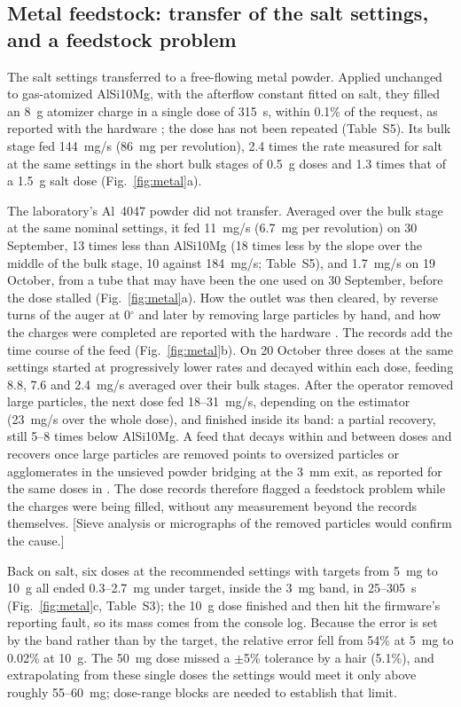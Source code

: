 \documentclass[preprint,12pt]{elsarticle}
\newcommand{\ph}[1]{\textcolor{orange!75!black}{\textsf{[#1]}}}
\begin{document}
\subsection{Metal feedstock: transfer of the salt settings, and a feedstock problem}
\label{sec:res-metal}

The salt settings transferred to a free-flowing metal powder. Applied unchanged to gas-atomized AlSi10Mg, with the afterflow constant fitted on salt, they filled an 8~g atomizer charge in a single dose of 315~s, within 0.1\% of the request, as reported with the hardware \cite{Charles2026Open}; the dose has not been repeated (Table~S5). Its bulk stage fed 144~mg/s (86~mg per revolution), 2.4 times the rate measured for salt at the same settings in the short bulk stages of 0.5~g doses and 1.3 times that of a 1.5~g salt dose (Fig.~\ref{fig:metal}a).

The laboratory's Al~4047 powder did not transfer. Averaged over the bulk stage at the same nominal settings, it fed 11~mg/s (6.7~mg per revolution) on 30 September, 13 times less than AlSi10Mg (18 times less by the slope over the middle of the bulk stage, 10 against 184~mg/s; Table~S5), and 1.7~mg/s on 19 October, from a tube that may have been the one used on 30 September, before the dose stalled (Fig.~\ref{fig:metal}a). How the outlet was then cleared, by reverse turns of the auger at 0$^\circ$ and later by removing large particles by hand, and how the charges were completed are reported with the hardware \cite{Charles2026Open}. The records add the time course of the feed (Fig.~\ref{fig:metal}b). On 20 October three doses at the same settings started at progressively lower rates and decayed within each dose, feeding 8.8, 7.6 and 2.4~mg/s averaged over their bulk stages. After the operator removed large particles, the next dose fed 18--31~mg/s, depending on the estimator (23~mg/s over the whole dose), and finished inside its band: a partial recovery, still 5--8 times below AlSi10Mg. A feed that decays within and between doses and recovers once large particles are removed points to oversized particles or agglomerates in the unsieved powder bridging at the 3~mm exit, as reported for the same doses in \cite{Charles2026Open}. The dose records therefore flagged a feedstock problem while the charges were being filled, without any measurement beyond the records themselves. \ph{Sieve analysis or micrographs of the removed particles would confirm the cause.}

Back on salt, six doses at the recommended settings with targets from 5~mg to 10~g all ended 0.3--2.7~mg under target, inside the 3~mg band, in 25--305~s (Fig.~\ref{fig:metal}c, Table~S3); the 10~g dose finished and then hit the firmware's reporting fault, so its mass comes from the console log. Because the error is set by the band rather than by the target, the relative error fell from 54\% at 5~mg to 0.02\% at 10~g. The 50~mg dose missed a $\pm$5\% tolerance by a hair (5.1\%), and extrapolating from these single doses the settings would meet it only above roughly 55--60~mg; dose-range blocks are needed to establish that limit.
\end{document}
